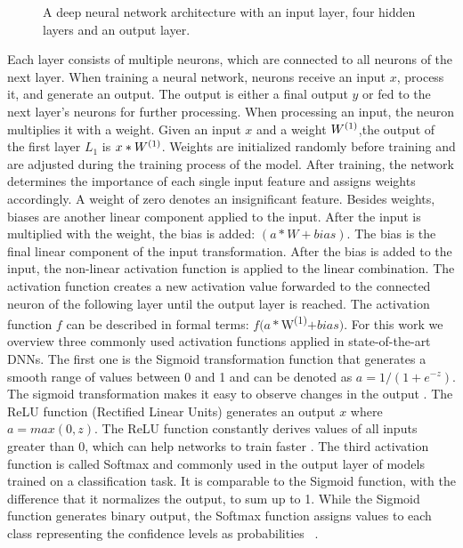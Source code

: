 \begin{figure}
\begin{tikzpicture}[x=0.75pt,y=0.75pt,yscale=-1.5,xscale=1.5]
\end{tikzpicture}

\caption[A DNN architecture with multiple layers]{A deep neural network architecture with an input layer, four hidden layers and an output layer.}
\label{fig:DNN}
\end{figure}

Each layer consists of multiple neurons, which are connected to all neurons of the next layer. When training a neural network, neurons receive an input $x$, process it, and generate an output. The output is either a final output $y$ or fed to the next layer's neurons for further processing. When processing an input, the neuron multiplies it with a weight. Given an input $x$ and a weight $W\textsuperscript{(1)}$,the output of the first layer $L_1$ is $x*W\textsuperscript{(1)}$. Weights are initialized randomly before training and are adjusted during the training process of the model. After training, the network determines the importance of each single input feature and assigns weights accordingly. A weight of zero denotes an insignificant feature. Besides weights, biases are another linear component applied to the input. After the input is multiplied with the weight, the bias is added: $(a*W+bias)$.
The bias is the final linear component of the input transformation. After the bias is added to the input, the non-linear activation function is applied to the linear combination. The activation function creates a new activation value forwarded to the connected neuron of the following layer until the output layer is reached. The activation function $f$ can be described in formal terms: 
$f(a*$W\textsuperscript{(1)}$+bias)$.
For this work we overview three commonly used activation functions applied in state-of-the-art DNNs. The first one is the Sigmoid transformation function that generates a smooth range of values between 0 and 1 and can be denoted as $a = 1 / (1 + e^{-z})$. The sigmoid transformation makes it easy to observe changes in the output \cite{han1995influence}. The ReLU function (Rectified Linear Units) generates an output $x$ where $a = max(0, z)$. The ReLU function constantly derives values of all inputs greater than 0, which can help networks to train faster \cite{glorot2011deep}. 
The third activation function is called Softmax and commonly used in the output layer of models trained on a classification task. It is comparable to the Sigmoid function, with the difference that it normalizes the output, to sum up to 1. While the Sigmoid function generates binary output, the Softmax function assigns values to each class representing the confidence levels as probabilities ~\protect\cite{jang2016categorical}.

